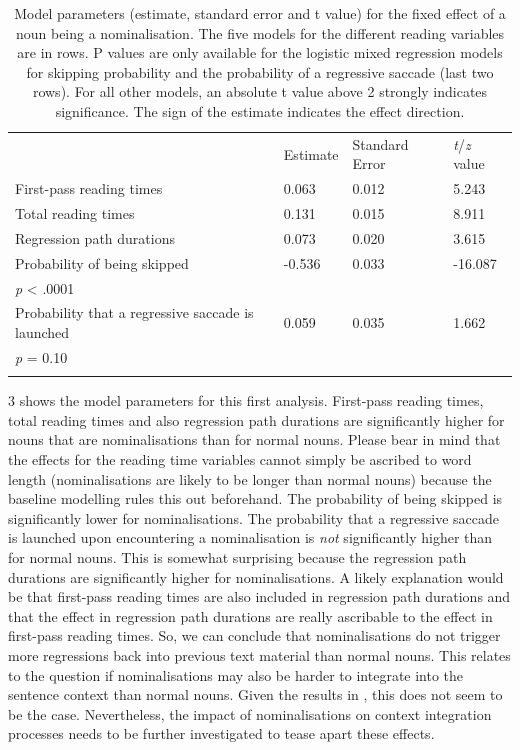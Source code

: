 \documentclass[output=paper]{langsci/langscibook}
\begin{document}
\begin{table}
\begin{tabular}{llll} & Estimate & Standard Error & \textit{t}/\textit{z} value\\
\lsptoprule
 First-pass reading times & 0.063 & 0.012 & 5.243\\
 Total reading times & 0.131 & 0.015 & 8.911\\
 Regression path durations & 0.073 & 0.020 & 3.615\\
 Probability of being skipped & {}-0.536 & 0.033 & {}-16.087\\
\textit{p} {\textless} .0001\\
 Probability that a regressive saccade is launched & 0.059 & 0.035 & 1.662\\
\textit{p} = 0.10\\
\lspbottomrule
\end{tabular}
\caption{Model parameters (estimate, standard error and t value) for the fixed effect of a noun being a nominalisation. The five models for the different reading variables are in rows. P values are only available for the logistic mixed regression models for skipping probability and the probability of a regressive saccade (last two rows). For all other models, an absolute t value above 2 strongly indicates significance. The sign of the estimate indicates the effect direction.}
\label{tab:3}
\end{table}
3 shows the model parameters for this first analysis. First-pass reading times, total reading times and also regression path durations are significantly higher for nouns that are nominalisations than for normal nouns. Please bear in mind that the effects for the reading time variables cannot simply be ascribed to word length (nominalisations are likely to be longer than normal nouns) because the baseline modelling rules this out beforehand. The probability of being skipped is significantly lower for nominalisations. The probability that a regressive saccade is launched upon encountering a nominalisation is \textit{not} significantly higher than for normal nouns. This is somewhat surprising because the regression path durations are significantly higher for nominalisations. A likely explanation would be that first-pass reading times are also included in regression path durations and that the effect in regression path durations are really ascribable to the effect in first-pass reading times. So, we can conclude that nominalisations do not trigger more regressions back into previous text material than normal nouns. This relates to the question if nominalisations may also be harder to integrate into the sentence context than normal nouns. Given the results in , this does not seem to be the case. Nevertheless, the impact of nominalisations on context integration processes needs to be further investigated to tease apart these effects.
\end{document}
